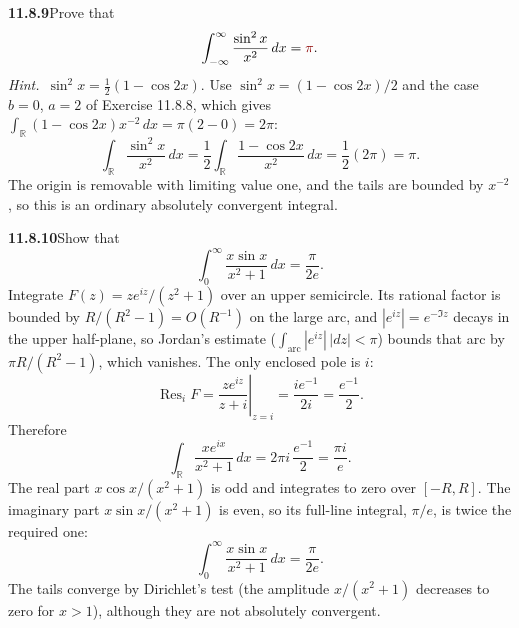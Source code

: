 \par\bigskip
\noindent\textbf{11.8.9}\quad Prove that
\[
\int_{-\infty}^{\infty}\frac{\sin^{2}x}{x^{2}}\,dx=\erratum{\pi}.
\]
\emph{Hint.}~$\sin^{2}x=\frac{1}{2}(1-\cos2x)$.
\solution
Use $\sin^2x=(1-\cos2x)/2$ and the case $b=0$, $a=2$ of
Exercise 11.8.8, which gives $\int_{\mathbb R}(1-\cos2x)x^{-2}\,dx
=\pi(2-0)=2\pi$:
\[
\int_{\mathbb R}\frac{\sin^2x}{x^2}\,dx
=\frac12\int_{\mathbb R}\frac{1-\cos2x}{x^2}\,dx
=\frac12(2\pi)=\boxed{\pi}.
\]
The origin is removable with limiting value one, and the tails are
bounded by $x^{-2}$, so this is an ordinary absolutely convergent
integral.

\par\bigskip
\noindent\textbf{11.8.10}\quad Show that
\[
\int_{0}^{\infty}\frac{x\sin x}{x^{2}+1}\,dx=\frac{\pi}{2e}.
\]
\solution
Integrate $F(z)=ze^{iz}/(z^2+1)$ over an upper semicircle.
Its rational factor is bounded by $R/(R^2-1)=O(R^{-1})$ on the large
arc, and $|e^{iz}|=e^{-\Im z}$ decays in the upper half-plane, so
Jordan's estimate ($\int_{\text{arc}}|e^{iz}|\,|dz|<\pi$) bounds that
arc by $\pi R/(R^2-1)$, which vanishes. The only enclosed pole is $i$:
\[
\operatorname{Res}_{i}F
=\left.\frac{ze^{iz}}{z+i}\right|_{z=i}=\frac{ie^{-1}}{2i}
=\frac{e^{-1}}2.
\]
Therefore
\[
\int_{\mathbb R}\frac{xe^{ix}}{x^2+1}\,dx=2\pi i\,\frac{e^{-1}}2
=\frac{\pi i}{e}.
\]
The real part $x\cos x/(x^2+1)$ is odd and integrates to zero over
$[-R,R]$. The imaginary part $x\sin x/(x^2+1)$ is even, so its
full-line integral, $\pi/e$, is twice the required one:
\[
\boxed{\int_0^\infty\frac{x\sin x}{x^2+1}\,dx=\frac{\pi}{2e}}.
\]
The tails converge by Dirichlet's test (the amplitude
$x/(x^2+1)$ decreases to zero for $x>1$), although they are not
absolutely convergent.

